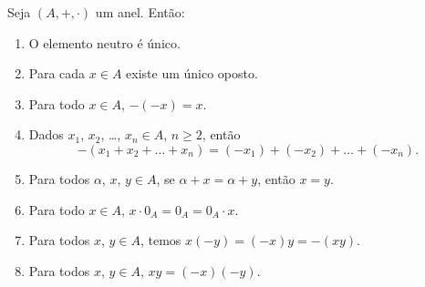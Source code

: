 \begin{proposicao}
    Seja $(A, + , \cdot)$ um anel. Então:
    \begin{enumerate}[label={\roman*})]
        \item O elemento neutro é {ú}nico.
        \item Para cada $x \in A$ existe um {ú}nico oposto.
        \item Para todo $x \in A$, $-(-x) = x$.
        \item Dados $x_{1}$, $x_{2}$, \dots, $x_n \in A$, $n \geqslant 2$, então
        \[
            -(x_1 + x_2 + \dots + x_n) = (-x_1) + (-x_2) + \dots + (-x_n).
        \]
        \item Para todos $\alpha$, $x$, $y \in A$, se $\alpha + x = \alpha + y$, então $x = y$.
        \item Para todo $x \in A$, $x\cdot 0_A = 0_A = 0_A\cdot x$.
        \item Para todos $x$, $y \in A$, temos $x(-y) = (-x)y = -(xy)$.
        \item Para todos $x$, $y \in A$, $xy = (-x)(-y)$.
    \end{enumerate}
\end{proposicao}
